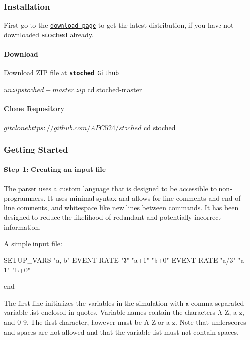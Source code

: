 \subsubsection*{Installation}

First go to the \href{https://github.com/APC524/stoched}{\tt download page} to get the latest distribution, if you have not downloaded {\bfseries stoched} already.

\paragraph*{Download}

Download Z\+IP file at \href{https://github.com/APC524/stoched}{\tt {\bfseries stoched} Github} \begin{DoxyVerb}$ unzip stoched-master.zip
$ cd stoched-master
\end{DoxyVerb}


\paragraph*{Clone Repository}

\begin{DoxyVerb}$ git clone https://github.com/APC524/stoched
$ cd stoched
\end{DoxyVerb}


\subsubsection*{Getting Started}

\paragraph*{Step 1\+: Creating an input file}

The parser uses a custom language that is designed to be accessible to non-\/programmers. It uses minimal syntax and allows for line comments and end of line comments, and whitespace like new lines between commands. It has been designed to reduce the likelihood of redundant and potentially incorrect information.

A simple input file\+: \begin{DoxyVerb}SETUP_VARS "a, b"
EVENT RATE "3" "a+1" "b+0"
EVENT RATE "a/3" "a-1" "b+0"

end
\end{DoxyVerb}


The first line initializes the variables in the simulation with a comma separated variable list enclosed in quotes. Variable names contain the characters A-\/Z, a-\/z, and 0-\/9. The first character, however must be A-\/Z or a-\/z. Note that underscores and spaces are not allowed and that the variable list must not contain spaces.

